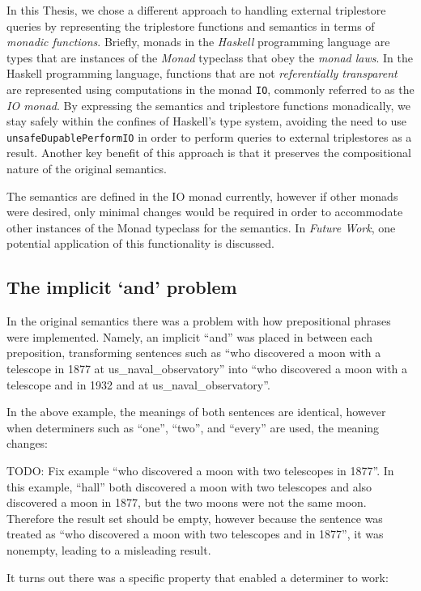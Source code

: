 \documentclass[../main.tex]{subfiles}
\begin{document}
In this Thesis, we chose a different approach to handling external triplestore queries by representing the triplestore functions and semantics in terms of {\em monadic functions}.
Briefly, monads in the {\em Haskell} programming language are types that are instances of the {\em Monad} typeclass that obey the
{\em monad laws}.  In the Haskell programming language, functions that are not {\em referentially transparent} are represented using computations in the monad \texttt{IO}, commonly referred to as the {\em IO monad}.  By expressing the semantics and triplestore functions monadically, we stay safely within the confines of Haskell's type system, avoiding
the need to use \texttt{unsafeDupablePerformIO} in order to perform queries to external triplestores as a result.  Another key benefit of this approach is that it preserves the compositional nature of the original semantics.

The semantics are defined in the IO monad currently, however if other monads were desired, only minimal changes would be required in order to accommodate
other instances of the Monad typeclass for the semantics.  In {\em Future Work}, one potential application of this functionality is discussed.

\subsection{The implicit `and' problem}

In the original semantics there was a problem with how prepositional phrases were implemented.  Namely, an implicit ``and'' was placed in between
each preposition, transforming sentences such as ``who discovered a moon with a telescope in 1877 at us\_naval\_observatory'' into ``who discovered a moon with a telescope and in 1932 and at us\_naval\_observatory''.

In the above example, the meanings of both sentences are identical, however when determiners such as ``one'', ``two'', and ``every'' are used, the meaning changes:

TODO: Fix example
``who discovered a moon with two telescopes in 1877''.  In this example, ``hall'' both discovered a moon with two telescopes and also discovered a moon
in 1877, but the two moons were not the same moon.  Therefore the result set should be empty, however because the sentence was treated as
``who discovered a moon with two telescopes and in 1877'', it was nonempty, leading to a misleading result.

It turns out there was a specific property that enabled a determiner to work:
\end{document}
